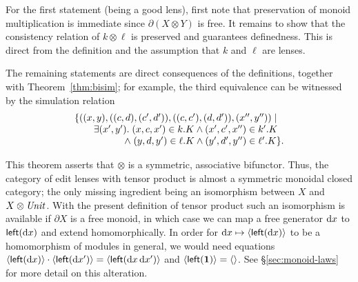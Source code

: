 \begin{pf}
  For the first statement (being a good lens), first note that preservation
  of monoid multiplication is immediate since
  $\partial(X\otimes Y)$ is free. It remains to show that the
  consistency relation of $k\otimes\ell$ is preserved and guarantees
  definedness. This is direct from the definition and the
  assumption that $k$ and $\ell$ are lenses.

  The remaining statements are direct consequences of the definitions,
  together with Theorem~\ref{thm:bisim}; for example, the third
  equivalence can be witnessed by the simulation relation
\[
\begin{array}{@{}l@{}}
\{
((x,y),((c,d),(c',d')),((c,c'),(d,d')),(x'',y'')) \mid \\ \qquad
\exists (x',y'). \; (x,c,x')\in k.K \wedge (x',c',x'')\in k'.K \\ \hspace*{5.2em} 
                 \mathrel{\wedge} (y,d,y')\in \ell.K\wedge (y',d',y'')\in \ell'.K \}
.
\end{array}
\]
\baselineskip
\end{pf}

\iffull
This theorem asserts that $\otimes$ is a symmetric, associative
bifunctor. Thus, the category of edit lenses with tensor product is
almost a symmetric monoidal closed category; the only missing
ingredient being an isomorphism between $X$ and $X\otimes \mathit{Unit}$. With
the present definition of tensor product such an isomorphism is available
if $\partial X$ is a free monoid, in which case we can map a free
generator $\textrm{d} x$ to $\mathsf{left}(\textrm{d} x)$ and extend homomorphically.
In order for $\textrm{d} x\mapsto\left<\mathsf{left}(\textrm{d} x)\right>$ to be a homomorphism of
modules in general, we would need equations $\left<\mathsf{left}(\textrm{d} x)\right>
\cdot \left<\mathsf{left}(\textrm{d} x')\right> = \left<\mathsf{left}(\textrm{d} x\,\textrm{d} x')\right>$ and
$\left<\mathsf{left}(\mbox{\bf{1}})\right> = \left<\right>$. See \S\ref{sec:monoid-laws} for
more detail on this alteration.
\fi

